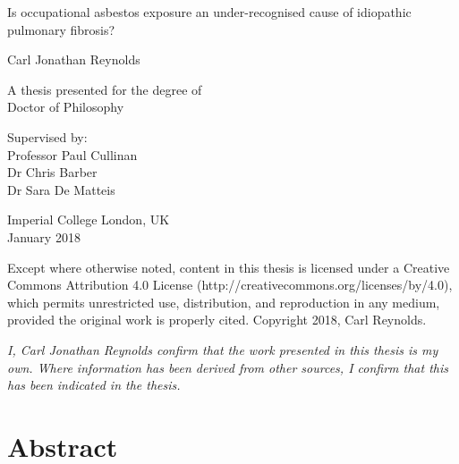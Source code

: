\documentclass[12pt,a4paper,]{report}
\date{}
\begin{document}
\begin{titlepage}
    \begin{center}
        
        \vspace*{2.5cm}
        
        \huge
        Is occupational asbestos exposure an under-recognised cause of idiopathic pulmonary fibrosis?
        \vspace{1.5cm}
        
        \Large
        Carl Jonathan Reynolds
        
        \vspace{1.5cm}

        \normalsize
        A thesis presented for the degree of\\
        Doctor of Philosophy
        
        \vfill
        
        \normalsize
        Supervised by:\\
        Professor Paul Cullinan\\
        Dr Chris Barber \\
        Dr Sara De Matteis

        \vspace{0.8cm}

        \normalsize
        Imperial College London, UK\\
        January 2018

         Except where otherwise noted, content in this thesis is licensed under a Creative Commons Attribution 4.0 License (http://creativecommons.org/licenses/by/4.0), which permits unrestricted use, distribution, and reproduction in any medium, provided the original work is properly cited. Copyright 2018, Carl Reynolds.

    \end{center}
\end{titlepage}

\vspace*{\fill}

\noindent \textit{
I, Carl Jonathan Reynolds confirm that the work presented in this thesis is my own. Where information has been derived from other sources, I confirm that this has been indicated in the thesis.
} \vspace*{\fill} 

\hypertarget{abstract}{%
\chapter*{Abstract}\label{abstract}}
\end{document}
